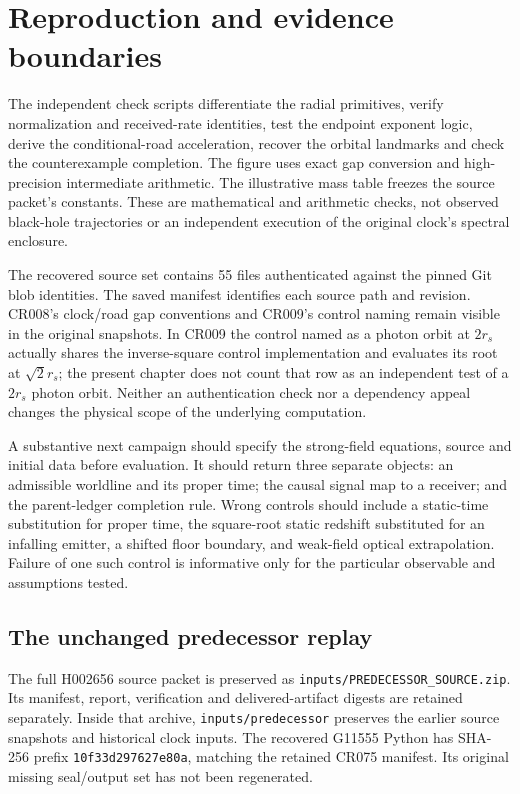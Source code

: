 \documentclass[10pt,twocolumn,letterpaper]{article}
\begin{document}
\section{Reproduction and evidence boundaries}
The independent check scripts differentiate the radial primitives,
verify normalization and received-rate identities, test the endpoint
exponent logic, derive the conditional-road acceleration, recover the
orbital landmarks and check the counterexample completion. The figure
uses exact gap conversion and high-precision intermediate arithmetic.
The illustrative mass table freezes the source packet's constants.
These are mathematical and arithmetic checks, not observed black-hole
trajectories or an independent execution of the original clock's
spectral enclosure.

The recovered source set contains 55 files authenticated against the
pinned Git blob identities. The saved manifest identifies each source
path and revision. CR008's clock/road gap conventions and CR009's
control naming remain visible in the original snapshots. In CR009 the
control named as a photon orbit at $2r_s$ actually shares the
inverse-square control implementation and evaluates its root at
$\sqrt2r_s$; the present chapter does not count that row as an
independent test of a $2r_s$ photon orbit. Neither an authentication
check nor a dependency appeal changes the physical scope of the
underlying computation.

A substantive next campaign should specify the strong-field equations,
source and initial data before evaluation. It should return three
separate objects: an admissible worldline and its proper time; the
causal signal map to a receiver; and the parent-ledger completion rule.
Wrong controls should include a static-time substitution for proper
time, the square-root static redshift substituted for an infalling
emitter, a shifted floor boundary, and weak-field optical
extrapolation. Failure of one such control is informative only for the
particular observable and assumptions tested.


\subsection{The unchanged predecessor replay}
The full H002656 source packet is preserved as
\texttt{inputs/PREDECESSOR\_SOURCE.zip}. Its manifest, report,
verification and delivered-artifact digests are retained separately.
Inside that archive, \texttt{inputs/predecessor} preserves the earlier
source snapshots and historical clock inputs. The recovered G11555 Python
has SHA-256 prefix \texttt{10f33d297627e80a}, matching the retained CR075
manifest. Its original missing seal/output set has not been regenerated.
\end{document}
